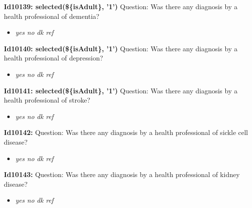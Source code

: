 \documentclass{article}%
\begin{document}
\textbf{Id10139: selected(\$\{isAdult\}, '1')\newline%
}%
Question: Was there any diagnosis by a health professional of dementia?\newline%
%
\begin{itemize}%
\item%
\textit{yes\newline%
 no\newline%
 dk\newline%
 ref\newline%
}%
\end{itemize}%
\textbf{Id10140: selected(\$\{isAdult\}, '1')\newline%
}%
Question: Was there any diagnosis by a health professional of depression?\newline%
%
\begin{itemize}%
\item%
\textit{yes\newline%
 no\newline%
 dk\newline%
 ref\newline%
}%
\end{itemize}%
\textbf{Id10141: selected(\$\{isAdult\}, '1')\newline%
}%
Question: Was there any diagnosis by a health professional of stroke?\newline%
%
\begin{itemize}%
\item%
\textit{yes\newline%
 no\newline%
 dk\newline%
 ref\newline%
}%
\end{itemize}%
\textbf{Id10142: \newline%
}%
Question: Was there any diagnosis by a health professional of sickle cell disease?\newline%
%
\begin{itemize}%
\item%
\textit{yes\newline%
 no\newline%
 dk\newline%
 ref\newline%
}%
\end{itemize}%
\textbf{Id10143: \newline%
}%
Question: Was there any diagnosis by a health professional of kidney disease?\newline%
%
\begin{itemize}%
\item%
\textit{yes\newline%
 no\newline%
 dk\newline%
 ref\newline%
}%
\end{itemize}%
\end{document}
